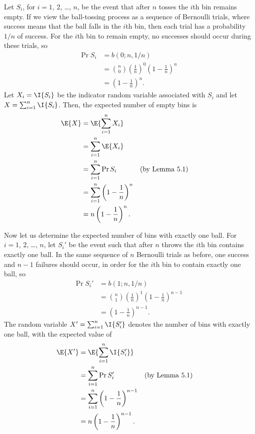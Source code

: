 \starred
Let $S_i$, for $i=1$, 2, \dots, $n$, be the event that after $n$ tosses the $i$th bin remains empty.
If we view the ball-tossing process as a sequence of Bernoulli trials, where success means that the ball falls in the $i$th bin, then each trial has a probability $1/n$ of success.
For the $i$th bin to remain empty, no successes should occur during these trials, so
\begin{align*}
    \Pr{S_i} &= b(0;n,1/n) \\
    &= \binom{n}{0}\left(\frac{1}{n}\right)^0\left(1-\frac{1}{n}\right)^n \\
    &= \left(1-\frac{1}{n}\right)^n.
\end{align*}
Let $X_i=\I{S_i}$ be the indicator random variable associated with $S_i$ and let $X=\sum_{i=1}^n\I{S_i}$.
Then, the expected number of empty bins is
\begin{align*}
    \E{X} &= \E{\sum_{i=1}^nX_i} \\
    &= \sum_{i=1}^n\E{X_i} \\
    &= \sum_{i=1}^n\Pr{S_i} && \text{(by Lemma 5.1)} \\
    &= \sum_{i=1}^n\left(1-\frac{1}{n}\right)^n \\
    &= n\left(1-\frac{1}{n}\right)^n.
\end{align*}

Now let us determine the expected number of bins with exactly one ball.
For $i=1$, 2, \dots, $n$, let $S_i'$ be the event such that after $n$ throws the $i$th bin contains exactly one ball.
In the same sequence of $n$ Bernoulli trials as before, one success and $n-1$ failures should occur, in order for the $i$th bin to contain exactly one ball, so
\begin{align*}
    \Pr{S_i'} &= b(1;n,1/n) \\
    &= \binom{n}{1}\left(\frac{1}{n}\right)^1\left(1-\frac{1}{n}\right)^{n-1} \\
    &= \left(1-\frac{1}{n}\right)^{n-1}.
\end{align*}
The random variable $X'=\sum_{i=1}^n\I{S_i'}$ denotes the number of bins with exactly one ball, with the expected value of
\begin{align*}
    \E{X'} &= \E{\sum_{i=1}^n\I{S_i'}} \\
    &= \sum_{i=1}^n\Pr{S_i'} && \text{(by Lemma 5.1)} \\
    &= \sum_{i=1}^n\left(1-\frac{1}{n}\right)^{n-1} \\
    &= n\left(1-\frac{1}{n}\right)^{n-1}.
\end{align*}

